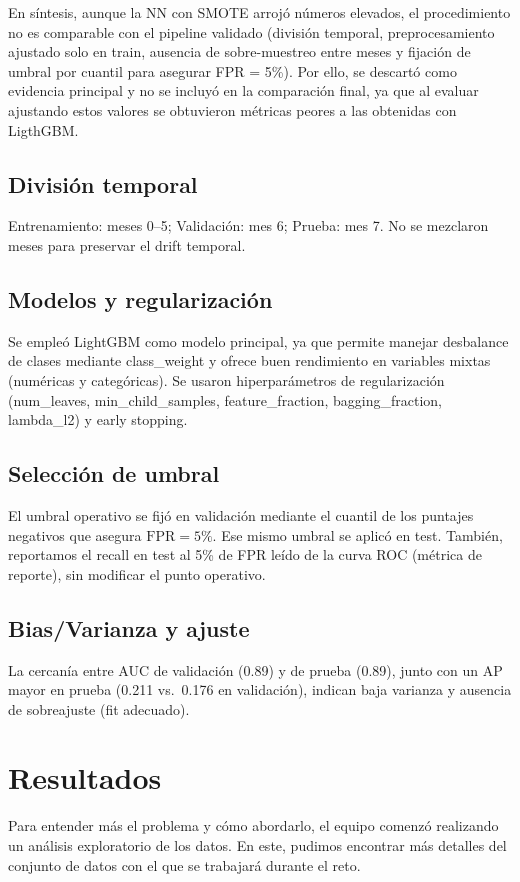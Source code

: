 \documentclass[runningheads]{llncs}
\begin{document}
En síntesis, aunque la NN con SMOTE arrojó números elevados, el procedimiento no es comparable con el pipeline validado (división temporal, preprocesamiento ajustado solo en train, ausencia de sobre-muestreo entre meses y fijación de umbral por cuantil para asegurar FPR = 5\%). Por ello, se descartó como evidencia principal y no se incluyó en la comparación final, ya que al evaluar ajustando estos valores se obtuvieron métricas peores a las obtenidas con LigthGBM.

\subsection{División temporal}
Entrenamiento: meses 0--5; Validación: mes 6; Prueba: mes 7. 
No se mezclaron meses para preservar el drift temporal.

\subsection{Modelos y regularización}
Se empleó LightGBM como modelo principal, ya que permite manejar desbalance de clases 
mediante class\_weight y ofrece buen rendimiento en variables mixtas 
(numéricas y categóricas). Se usaron hiperparámetros de regularización 
(num\_leaves, min\_child\_samples, feature\_fraction, 
bagging\_fraction, lambda\_l2) y early stopping.

\subsection{Selección de umbral}
El umbral operativo se fijó en validación mediante el cuantil de los puntajes negativos que asegura \(\mathrm{FPR}=5\%\). Ese mismo umbral se aplicó en test. También, reportamos el recall en test al 5\% de FPR leído de la curva ROC (métrica de reporte), sin modificar el punto operativo.

\subsection{Bias/Varianza y ajuste}
La cercanía entre AUC de validación (0.89) y de prueba (0.89), junto con un AP mayor en prueba (0.211 vs.\ 0.176 en validación),
indican baja varianza y ausencia de sobreajuste (fit adecuado).


\section{Resultados}
Para entender más el problema y cómo abordarlo, el equipo comenzó realizando un análisis exploratorio de los datos. En este, pudimos encontrar más detalles del conjunto de datos con el que se trabajará durante el reto.
\end{document}
